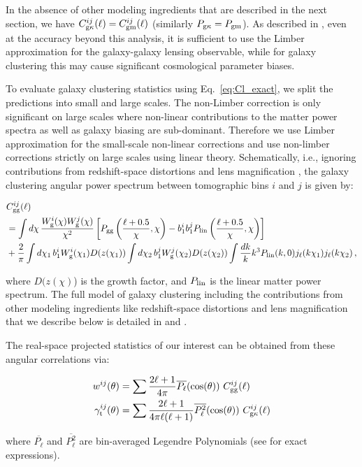\documentclass[aps, prd,twocolumn,superscriptaddress,nofootinbib,preprintnumbers]{revtex4-1}
\begin{document}
In the absence of other modeling ingredients that are described in the next section, we have $C^{ij}_{\rm g\kappa}(\ell) = C^{ij}_{\rm gm}(\ell)$ (similarly $P_{\rm g\kappa} = P_{\rm gm}$). As described in \citet{Fang_nonlimber}, even at the accuracy beyond this analysis, it is sufficient to use  the Limber approximation for the galaxy-galaxy lensing observable, while for galaxy clustering this may cause significant cosmological parameter biases. 

To evaluate galaxy clustering statistics using Eq.~\ref{eq:Cl_exact}, we split the predictions into small and large scales. The non-Limber correction is only significant on large scales where non-linear contributions to the matter power spectra as well as galaxy biasing are sub-dominant. Therefore we use Limber approximation for the small-scale non-linear corrections and use non-limber corrections strictly on large scales using linear theory. Schematically, i.e., ignoring contributions from redshift-space distortions and lens magnification \cite[see][for details]{y3-generalmethods}, the galaxy clustering angular power spectrum between tomographic bins $i$ and $j$ is given by:
\begin{widetext}
\begin{align}
    &C_{\rm gg}^{ij} (\ell) \nonumber\\
    &= \int d\chi\, \frac{W_{\rm g}^i(\chi)W_{\rm g}^j(\chi)}{\chi^2} \left[P_{\rm gg}\left(\frac{\ell+0.5}{\chi},\chi\right)- b_1^{i} b_1^{j} P_{\rm lin}\left(\frac{\ell+0.5}{\chi},\chi\right)\right]\nonumber\\
    &+\frac{2}{\pi}\int d\chi_1\,b_{1}^i W_{\rm g}^i(\chi_1) D(z(\chi_1))\int d\chi_2\,b_{1}^j W_{\rm g}^j(\chi_2)D(z(\chi_2)) \int\frac{dk}{k}k^3 P_{\rm lin}(k,0)j_\ell(k\chi_1)j_\ell(k\chi_2)\,,
\label{eq:Cl-DD_rewrite}
\end{align}
\end{widetext}

where $D(z(\chi)$) is the growth factor, and $P_{\rm lin}$ is the linear matter power spectrum. The full model of galaxy clustering including the contributions from other modeling ingredients like redshift-space distortions and lens magnification that we describe below is detailed in \cite{Fang_nonlimber} and \cite{y3-generalmethods}. 

The real-space projected statistics of our interest can be obtained from these angular correlations via:
\begin{linenomath*}
\begin{align}\label{eq:2pt_exact}
    w^{ij}(\theta) &= \sum \frac{2\ell + 1}{4\pi} \overline{P_{\ell}}(\cos(\theta)) \ C^{ij}_{\rm gg}(\ell) \\
    \gamma_{\rm t}^{ij}(\theta) &= \sum \frac{2\ell + 1}{4\pi \ell (\ell + 1)} \overline{P_{\ell}^2}(\cos(\theta)) \ C^{ij}_{\rm g\kappa}(\ell)
\end{align}
\end{linenomath*}
where $\overline{P_{\ell}}$ and $\overline{P_{\ell}^2}$ are bin-averaged Legendre Polynomials (see \citealt{y3-covariances} for exact expressions). 
\end{document}
